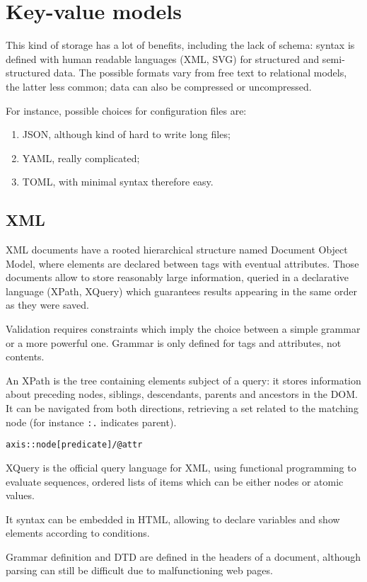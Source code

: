 \section{Key-value models}
This kind of storage has a lot of benefits, including the lack of schema: syntax is defined with human readable languages (XML, SVG) for structured and semi-structured data. The possible formats vary from free text to relational models, the latter less common; data can also be compressed or uncompressed. 

For instance, possible choices for configuration files are:
\begin{enumerate}
	\item JSON, although kind of hard to write long files;
	\item YAML, really complicated;
	\item TOML, with minimal syntax therefore easy.
\end{enumerate}

\subsection{XML}
XML documents have a rooted hierarchical structure named Document Object Model, where elements are declared between tags with eventual attributes. Those documents allow to store reasonably large information, queried in a declarative language (XPath, XQuery) which guarantees results appearing in the same order as they were saved. 

Validation requires constraints which imply the choice between a simple grammar or a more powerful one. Grammar is only defined for tags and attributes, not contents. 

An XPath is the tree containing elements subject of a query: it stores information about preceding nodes, siblings, descendants, parents and ancestors in the DOM. It can be navigated from both directions, retrieving a set related to the matching node (for instance \texttt{:.} indicates parent). 

\texttt{axis::node[predicate]/@attr}

XQuery is the official query language for XML, using functional programming to evaluate sequences, ordered lists of items which can be either nodes or atomic values. 

It syntax can be embedded in HTML, allowing to declare variables and show elements according to conditions.

Grammar definition and DTD are defined in the headers of a document, although parsing can still be difficult due to malfunctioning web pages. 

